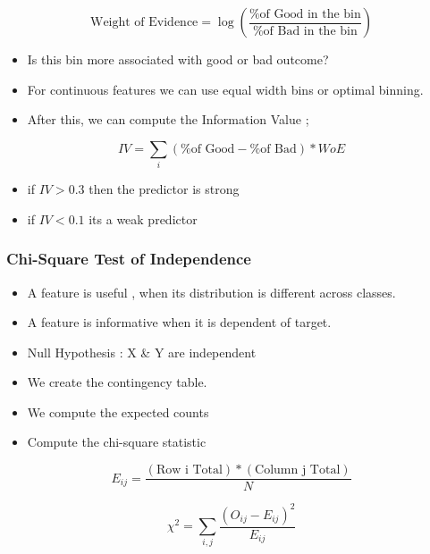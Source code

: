 \documentclass[10pt,a4paper]{article}
\begin{document}
	$$	\text{Weight of Evidence} = \log \left(\frac{\text{\% of Good in the bin}} {\text{\% of Bad in the bin}} \right)
	$$
	\begin{itemize}
		\item Is this bin more associated with good or bad outcome?
		\item For continuous features we can use equal width bins or optimal binning.
		\item After this, we can compute the Information Value ;
	\end{itemize}

	$$	IV = \sum_{i} (\text{\% of Good} - \text{\% of Bad}) * WoE
	$$
	\begin{itemize}
		\item if $IV>0.3$ then the predictor is strong
		\item if $IV <0.1$ its a weak predictor
	\end{itemize}

	\subsubsection{Chi-Square Test of Independence}

	\begin{itemize}
		\item A feature is useful , when its distribution is different across classes.
		\item A feature is informative when it is dependent of target.
		\item Null Hypothesis : X \& Y are independent
		\item We create the contingency table.
		\item We compute the expected counts
		\item Compute the chi-square statistic
	\end{itemize}
	\[
	E_{ij} = \frac{(\text{Row i Total}) * (\text{Column j Total})}{N}
	\]
	
	\[
	\chi^2 = \sum_{i,j} \frac{(O_{ij} - E_{ij})^2}{E_{ij}}
	\]
	
\end{document}
